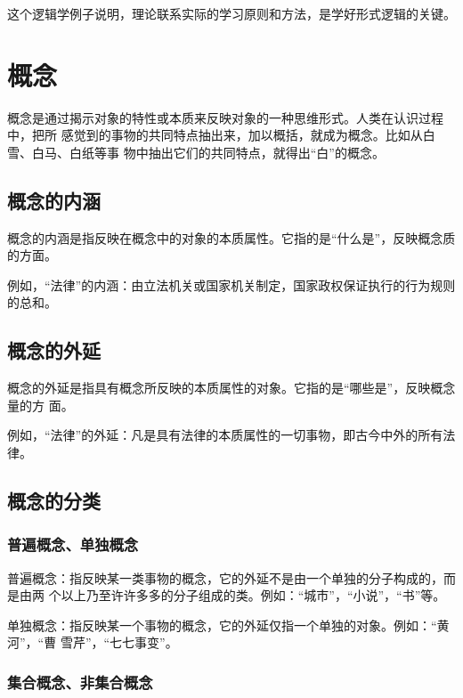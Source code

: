 \documentclass[final,oneside]{ctexbook}
\begin{document}
这个逻辑学例子说明，理论联系实际的学习原则和方法，是学好形式逻辑的关键。

\section{概念}

概念是通过揭示对象的特性或本质来反映对象的一种思维形式。人类在认识过程中，把所
感觉到的事物的共同特点抽出来，加以概括，就成为概念。比如从白雪、白马、白纸等事
物中抽出它们的共同特点，就得出“白”的概念。

\subsection{概念的内涵}

概念的内涵是指反映在概念中的对象的本质属性。它指的是“什么是”，反映概念质的方面。

例如，“法律”的内涵：由立法机关或国家机关制定，国家政权保证执行的行为规则的总和。

\subsection{概念的外延}

概念的外延是指具有概念所反映的本质属性的对象。它指的是“哪些是”，反映概念量的方
面。

例如，“法律”的外延：凡是具有法律的本质属性的一切事物，即古今中外的所有法律。

\subsection{概念的分类}

\subsubsection{普遍概念、单独概念}

普遍概念：指反映某一类事物的概念，它的外延不是由一个单独的分子构成的，而是由两
个以上乃至许许多多的分子组成的类。例如：“城市”，“小说”，“书”等。

单独概念：指反映某一个事物的概念，它的外延仅指一个单独的对象。例如：“黄河”，“曹
雪芹”，“七七事变”。

\subsubsection{集合概念、非集合概念}
\end{document}
